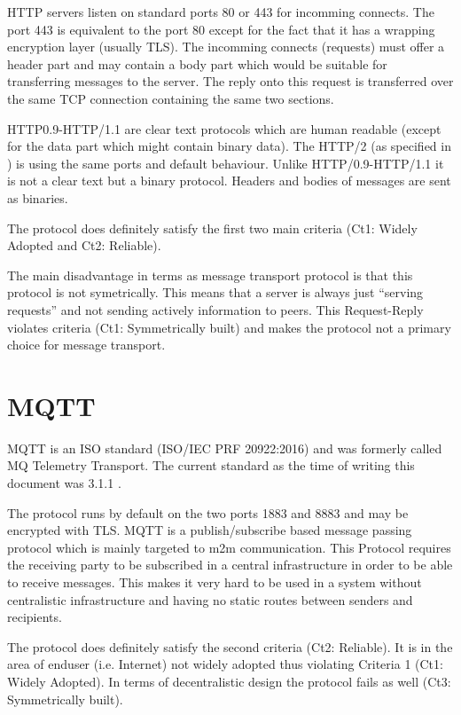 HTTP servers listen on standard ports 80 or 443 for incomming connects. The port 443 is equivalent to the port 80 except for the fact that it has a wrapping encryption layer (usually TLS). The incomming connects (requests) must offer a header part and may contain a body part which would be suitable for transferring messages to the server. The reply onto this request is transferred over the same TCP connection containing the same two sections.

HTTP0.9-HTTP/1.1 are clear text protocols which are human readable (except for the data part which might contain binary data). The HTTP/2 (as specified in \cite{RFC7540}) is using the same ports and default behaviour. Unlike HTTP/0.9-HTTP/1.1 it is not a clear text but a binary protocol. Headers and bodies of messages are sent as binaries. 

The protocol does definitely satisfy the first two main criteria (Ct1: Widely Adopted and Ct2: Reliable).

The main disadvantage in terms as message transport protocol is that this protocol is not symetrically. This means that a server is always just ``serving requests'' and not sending actively information to peers. This Request-Reply violates criteria (Ct1: Symmetrically built) and makes the protocol not a primary choice for  message transport. 

\section{MQTT}
MQTT is an ISO standard (ISO/IEC PRF 20922:2016) and was formerly called MQ Telemetry Transport. The current standard as the time of writing this document was 3.1.1 \cite{mqtt}. 

The protocol runs by default on the two ports 1883 and 8883 and may be encrypted with TLS. MQTT is a publish/subscribe based message passing protocol which is mainly targeted to m2m communication. This Protocol requires the receiving party to be subscribed in a central infrastructure in order to be able to receive messages. This makes it very hard to be used in a system without centralistic infrastructure and having no static routes between senders and recipients.

The protocol does definitely satisfy the second criteria (Ct2: Reliable). It is in the area of enduser (i.e. Internet) not widely adopted thus violating Criteria 1 (Ct1: Widely Adopted). In terms of decentralistic design the protocol fails as well (Ct3: Symmetrically built).

